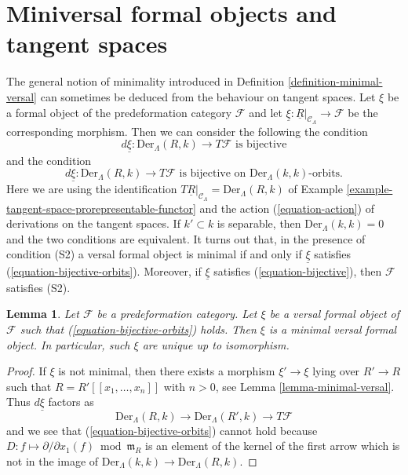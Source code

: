 \documentclass{stacks-project}
\theoremstyle{plain}
\newtheorem{lemma}[subsection]{Lemma}
\theoremstyle{definition}
\theoremstyle{remark}
\numberwithin{equation}{subsection}
\begin{document}
\section{Miniversal formal objects and tangent spaces}
\label{section-miniversal-objects-existence}

\noindent
The general notion of minimality introduced in
Definition \ref{definition-minimal-versal}
can sometimes be deduced from the behaviour on tangent spaces.
Let $\xi$ be a formal object of the predeformation category
$\mathcal{F}$ and let
$\underline{\xi} : \underline{R}|_{\mathcal{C}_\Lambda} \to \mathcal{F}$
be the corresponding morphism. Then we can consider the following
the condition
\begin{equation}
\label{equation-bijective}
d\underline{\xi} : \text{Der}_\Lambda(R, k) \to T\mathcal{F} 
\text{ is bijective}
\end{equation}
and the condition
\begin{equation}
\label{equation-bijective-orbits}
d\underline{\xi} : \text{Der}_\Lambda(R, k) \to T\mathcal{F} 
\text{ is bijective on }\text{Der}_\Lambda(k, k)\text{-orbits.}
\end{equation}
Here we are using the identification
$T\underline{R}|_{\mathcal{C}_\Lambda} = \text{Der}_\Lambda(R, k)$ of
Example \ref{example-tangent-space-prorepresentable-functor}
and the action (\ref{equation-action}) of derivations
on the tangent spaces. If $k' \subset k$ is separable, then
$\text{Der}_\Lambda(k, k) = 0$ and the two conditions are equivalent.
It turns out that, in the presence of condition (S2) a versal formal
object is minimal if and only if $\underline{\xi}$ satisfies
(\ref{equation-bijective-orbits}).
Moreover, if $\underline{\xi}$ satisfies (\ref{equation-bijective}), then
$\mathcal{F}$ satisfies (S2).

\begin{lemma}
\label{lemma-miniversal-object-unique}
Let $\mathcal{F}$ be a predeformation category.
Let $\xi$ be a versal formal object of $\mathcal{F}$ such that
(\ref{equation-bijective-orbits}) holds.
Then $\xi$ is a minimal versal formal object.
In particular, such $\xi$ are unique up to isomorphism.
\end{lemma}

\begin{proof}
If $\xi$ is not minimal, then there exists a morphism
$\xi' \to \xi$ lying over $R' \to R$ such that
$R = R'[[x_1, \ldots, x_n]]$ with $n > 0$, see
Lemma \ref{lemma-minimal-versal}.
Thus $d\underline{\xi}$ factors as
$$
\text{Der}_\Lambda(R, k) \to
\text{Der}_\Lambda(R', k) \to T\mathcal{F}
$$
and we see that (\ref{equation-bijective-orbits}) cannot hold
because $D : f \mapsto \partial/\partial x_1(f) \bmod \mathfrak m_R$
is an element of the kernel of the first arrow which is not in the image of
$\text{Der}_\Lambda(k, k) \to \text{Der}_\Lambda(R, k)$.
\end{proof}
\end{document}
